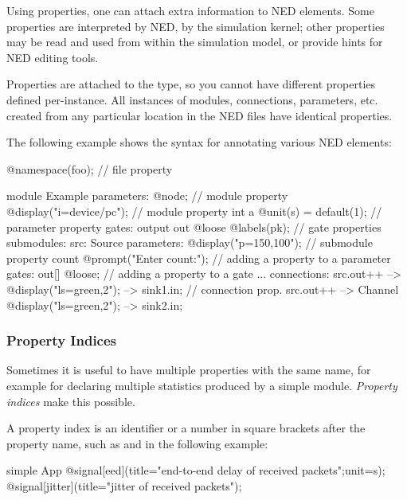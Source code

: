 
Using properties, one can attach extra information to NED elements. Some
properties are interpreted by NED, by the simulation kernel; other
properties may be read and used from within the simulation model, or
provide hints for NED editing tools.

Properties are attached to the type, so you cannot have different properties defined
per-instance. All instances of modules, connections,
parameters, etc. created from any particular location in the NED files have
identical properties.

The following example shows the syntax for annotating various NED elements:

\begin{ned}
@namespace(foo);  // file property

module Example
{
    parameters:
       @node;   // module property
       @display("i=device/pc");   // module property
       int a @unit(s) = default(1); // parameter property
    gates:
       output out @loose @labels(pk);  // gate properties
    submodules:
       src: Source {
           parameters:
              @display("p=150,100");  // submodule property
              count @prompt("Enter count:"); // adding a property to a parameter
           gates:
              out[] @loose;  // adding a property to a gate
       }
       ...
    connections:
       src.out++ --> { @display("ls=green,2"); } --> sink1.in; // connection prop.
       src.out++ --> Channel { @display("ls=green,2"); } --> sink2.in;
}
\end{ned}


\subsubsection{Property Indices}

Sometimes it is useful to have multiple properties with the same name,
for example for declaring multiple statistics produced by a simple module.
\textit{Property indices} make this possible.

A property index is an identifier or a number in square brackets after the
property name, such as  and  in the following example:

\begin{ned}
simple App {
    @signal[eed](title="end-to-end delay of received packets";unit=s);
    @signal[jitter](title="jitter of received packets");
}
\end{ned}

